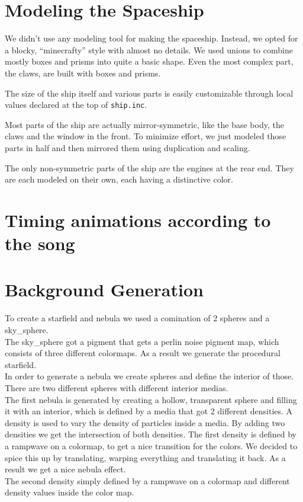 \documentclass[a4paper, 12pt]{scrartcl}
\begin{document}
    \section{Modeling the Spaceship}
    We didn't use any modeling tool for making the spaceship. Instead, we opted for a blocky, ``minecrafty'' style with almost no details. We used unions to combine mostly boxes and prisms into quite a basic shape. Even the most complex part, the claws, are built with boxes and prisms.

    The size of the ship itself and various parts is easily customizable through local values declared at the top of \texttt{ship.inc}.

    Most parts of the ship are actually mirror-symmetric, like the base body, the claws and the window in the front. To minimize effort, we just modeled those parts in half and then mirrored them using duplication and scaling.

    The only non-symmetric parts of the ship are the engines at the rear end. They are each modeled on their own, each having a distinctive color.

    \section{Timing animations according to the song}

    \section{Background Generation}
    To create a starfield and nebula we used a comination of 2 spheres and a sky\_sphere. \\ 
    The sky\_sphere got a pigment that gets a perlin noise pigment map, which consists of three different colormaps. As a result we generate the procedural starfield. \\
    In order to generate a nebula we create spheres and define the interior of those. There are two different spheres with different interior medias. \\
    The first nebula is generated by creating a hollow, transparent sphere and filling it with an interior, which is defined by a media that got 2 different densities. A density is used to vary the density of particles inside a media.
    By adding two densities we get the intersection of both densities. The first density is defined by a rampwave on a colormap, to get a nice transition for the colors. We decided to spice this up by translating, warping everything and translating it back. As a result we get a nice nebula effect. \\
    The second density simply defined by a rampwave on a colormap and different density values inside the color map.
\end{document}
